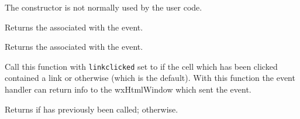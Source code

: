 The constructor is not normally used by the user code.


\label{wxhtmlcelleventgetcell}


Returns the  associated with the event.


\label{wxhtmlcelleventgetpoint}


Returns the  associated with the event.


\label{wxhtmlcelleventsetlinkclicked}


Call this function with {\tt linkclicked} set to \true if the cell which has been clicked contained a link or
\false otherwise (which is the default). With this function the event handler can return info to the
wxHtmlWindow which sent the event.


\label{wxhtmlcelleventgetlinkclicked}


Returns \true if  has previously been called;
\false otherwise.

